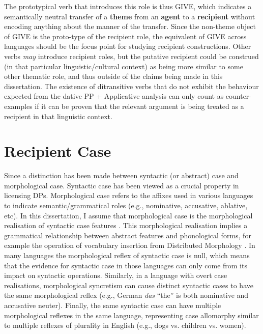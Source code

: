 The prototypical verb that introduces this role is thus GIVE, which indicates a semantically neutral transfer of a \textbf{theme} from an \textbf{agent} to a \textbf{recipient} without encoding anything about the manner of the transfer. Since the non-theme object of GIVE is the proto-type of the recipient role, the equivalent of GIVE across languages should be the focus point for studying recipient constructions. Other verbs \textit{may} introduce recipient roles, but the putative recipient could be construed (in that particular linguistic/cultural context) as being more similar to some other thematic role, and thus outside of the claims being made in this dissertation. The existence of ditransitive verbs that do not exhibit the behaviour expected from the dative PP + Applicative analysis can only count as counter-examples if it can be proven that the relevant argument is being treated as a recipient in that linguistic context.

\section{Recipient Case}
Since \cite{Vergnaud.1977} a distinction has been made between syntactic (or abstract) case and morphological case. Syntactic case has been viewed as a crucial property in licensing DPs. Morphological case refers to the affixes used in various languages to indicate semantic/grammatical roles (e.g., nominative, accusative, ablative, etc). In this dissertation, I assume that morphological case is the morphological realisation of syntactic case features \citep{Legate.2008}. This morphological realisation implies a grammatical relationship between abstract features and phonological forms, for example the operation of vocabulary insertion from Distributed Morphology \citep{Halle.1993}. In many languages the morphological reflex of syntactic case is null, which means that the evidence for syntactic case in those languages can only come from its impact on syntactic operations. Similarly, in a language with overt case realisations, morphological syncretism can cause distinct syntactic cases to have the same morphological reflex (e.g., German \textit{das} ``the'' is both nominative and accusative neuter). Finally, the same syntactic case can have multiple morphological reflexes in the same language, representing case allomorphy similar to multiple reflexes of plurality in English (e.g., dogs vs. children vs. women).

